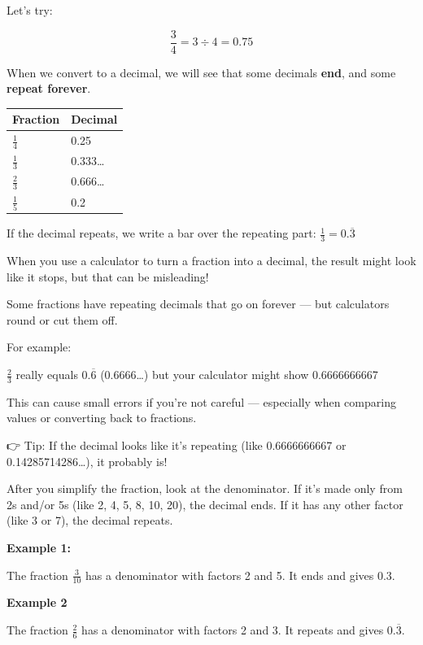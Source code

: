 \documentclass[
  letterpaper,
  DIV=11,
  numbers=noendperiod]{scrreprt}
\begin{document}
Let's try:

\[
\frac{3}{4} = 3 \div 4 = 0.75
\]

When we convert to a decimal, we will see that some decimals
\textbf{end}, and some \textbf{repeat forever}.

\begin{longtable}[]{@{}ll@{}}
\toprule\noalign{}
Fraction & Decimal \\
\midrule\noalign{}
\endhead
\bottomrule\noalign{}
\endlastfoot
\(\frac{1}{4}\) & 0.25 \\
\(\frac{1}{3}\) & 0.333\ldots{} \\
\(\frac{2}{3}\) & 0.666\ldots{} \\
\(\frac{1}{5}\) & 0.2 \\
\end{longtable}

If the decimal repeats, we write a bar over the repeating part:
\(\frac{1}{3} = 0.\overline{3}\)

When you use a calculator to turn a fraction into a decimal, the result
might look like it stops, but that can be misleading!

Some fractions have repeating decimals that go on forever --- but
calculators round or cut them off.

For example:

\(\frac{2}{3}\) really equals \(0.\overline{6}\) (0.6666\ldots) but your
calculator might show 0.6666666667

This can cause small errors if you're not careful --- especially when
comparing values or converting back to fractions.

👉 Tip: If the decimal looks like it's repeating (like 0.6666666667 or
0.14285714286\ldots), it probably is!

\begin{tcolorbox}[enhanced jigsaw, left=2mm, opacityback=0, colback=white, rightrule=.15mm, toptitle=1mm, colframe=quarto-callout-tip-color-frame, leftrule=.75mm, toprule=.15mm, breakable, bottomtitle=1mm, bottomrule=.15mm, colbacktitle=quarto-callout-tip-color!10!white, arc=.35mm, opacitybacktitle=0.6, titlerule=0mm, coltitle=black, title=\textcolor{quarto-callout-tip-color}{\faLightbulb}\hspace{0.5em}{What fractions have repeating decimals?}]

After you simplify the fraction, look at the denominator. If it's made
only from 2s and/or 5s (like 2, 4, 5, 8, 10, 20), the decimal ends. If
it has any other factor (like 3 or 7), the decimal repeats.

\textbf{Example 1:}

The fraction \(\frac{3}{10}\) has a denominator with factors 2 and 5. It
ends and gives 0.3.

\textbf{Example 2}

The fraction \(\frac{2}{6}\) has a denominator with factors 2 and 3. It
repeats and gives \(0.\overline{3}\).

\end{tcolorbox}
\end{document}
